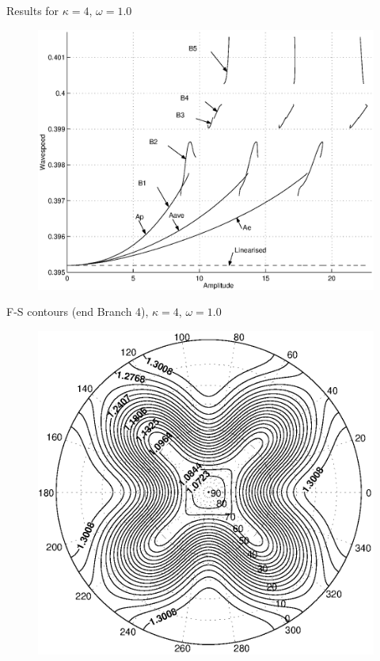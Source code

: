 \documentclass[pdf,distiller]{prosper}
\begin{document}
\begin{slide}{Results for $\kappa=4$, $\omega=1.0$}

\begin{figure}
	\centering
		\includegraphics[scale=0.49]{CvsAk4w1.eps}
\end{figure}
\end{slide}

\begin{slide}{F-S contours (end Branch 4), $\kappa=4$, $\omega=1.0$}
\begin{figure}
	\centering
		\includegraphics[scale=0.55]{k4w1fsb4end.eps}
	\end{figure}
\end{slide}
\end{document}
